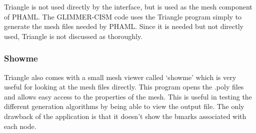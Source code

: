 Triangle is not used directly by the interface, but is used as the mesh component of PHAML.  The GLIMMER-CISM code uses the Triangle program simply to generate the mesh files needed by PHAML.  Since it is needed but not directly used, Triangle is not discussed as thoroughly.

\subsubsection{Showme}

Triangle also comes with a small mesh viewer called `showme' which is very useful for looking at the mesh files directly.  This program opens the .poly files and allows easy access to the properties of the mesh.  This is useful in testing the different generation algorithms by being able to view the output file.  The only drawback of the application is that it doesn't show the bmarks associated with each node. 


